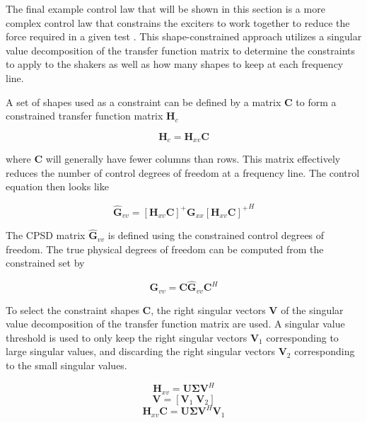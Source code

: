 \documentclass[pdf,12pt,report]{SANDreport}
\begin{document}
    The final example control law that will be shown in this section is a more complex control law that constrains the exciters to work together to reduce the force required in a given test \cite{schultz2020_shape_constrained_input_estimation_efficient_multishaker_vibration_testing}.  This shape-constrained approach utilizes a singular value decomposition of the transfer function matrix to determine the constraints to apply to the shakers as well as how many shapes to keep at each frequency line.
    
    A set of shapes used as a constraint can be defined by a matrix $\mathbf{C}$ to form a constrained transfer function matrix $\mathbf{H}_{c}$
    
    \begin{equation}
    \mathbf{H}_c = \mathbf{H}_{xv}\mathbf{C}
    \end{equation}
    
    where $\mathbf{C}$ will generally have fewer columns than rows.  This matrix effectively reduces the number of control degrees of freedom at a frequency line.  The control equation then looks like 
    
    \begin{equation}
    \hat{\mathbf{G}}_{vv} = [\mathbf{H}_{xv}\mathbf{C}]^+\mathbf{G}_{xx}{[\mathbf{H}_{xv}\mathbf{C}]^+}^H
    \end{equation}
    
    The \ac{CPSD} matrix $\hat{\mathbf{G}}_{vv}$ is defined using the constrained control degrees of freedom.  The true physical degrees of freedom can be computed from the constrained set by 
    
    \begin{equation}
    \mathbf{G}_{vv} = \mathbf{C}\hat{\mathbf{G}}_{vv}\mathbf{C}^H
    \end{equation}
    
    To select the constraint shapes $\mathbf{C}$, the right singular vectors $\mathbf{V}$ of the singular value decomposition of the transfer function matrix are used.  A singular value threshold is used to only keep the right singular vectors $\mathbf{V}_1$ corresponding to large singular values, and discarding the right singular vectors $\mathbf{V}_2$ corresponding to the small singular values.
    
    \begin{equation}
    \mathbf{H}_{xv} = \mathbf{U}\mathbf{\Sigma}\mathbf{V}^H
    \end{equation}
    \begin{equation}
    \mathbf{V} = [\mathbf{V}_1 \; \mathbf{V}_2]
    \end{equation}
    \begin{equation}
    \mathbf{H}_{xv}\mathbf{C} = \mathbf{U}\mathbf{\Sigma}\mathbf{V}^H\mathbf{V}_1
    \end{equation}
    
\end{document}
